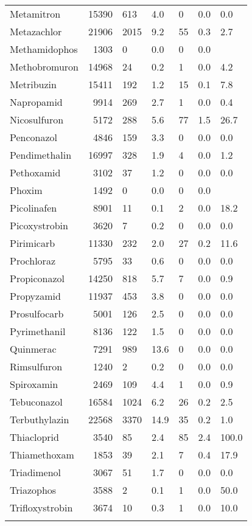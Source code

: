 \begin{longtable}{p{3cm}rR{1.4cm}R{1.4cm}R{1.4cm}R{1.4cm}R{1.4cm}}
  Metamitron & 15390 & 613 & 4.0 &  0 & 0.0 & 0.0 \\ 
  Metazachlor & 21906 & 2015 & 9.2 & 55 & 0.3 & 2.7 \\ 
  Methamidophos & 1303 &  0 & 0.0 &  0 & 0.0 &  \\ 
  Methobromuron & 14968 & 24 & 0.2 &  1 & 0.0 & 4.2 \\ 
  Metribuzin & 15411 & 192 & 1.2 & 15 & 0.1 & 7.8 \\ 
  Napropamid & 9914 & 269 & 2.7 &  1 & 0.0 & 0.4 \\ 
  Nicosulfuron & 5172 & 288 & 5.6 & 77 & 1.5 & 26.7 \\ 
  Penconazol & 4846 & 159 & 3.3 &  0 & 0.0 & 0.0 \\ 
  Pendimethalin & 16997 & 328 & 1.9 &  4 & 0.0 & 1.2 \\ 
  Pethoxamid & 3102 & 37 & 1.2 &  0 & 0.0 & 0.0 \\ 
  Phoxim & 1492 &  0 & 0.0 &  0 & 0.0 &  \\ 
  Picolinafen & 8901 & 11 & 0.1 &  2 & 0.0 & 18.2 \\ 
  Picoxystrobin & 3620 &  7 & 0.2 &  0 & 0.0 & 0.0 \\ 
  Pirimicarb & 11330 & 232 & 2.0 & 27 & 0.2 & 11.6 \\ 
  Prochloraz & 5795 & 33 & 0.6 &  0 & 0.0 & 0.0 \\ 
  Propiconazol & 14250 & 818 & 5.7 &  7 & 0.0 & 0.9 \\ 
  Propyzamid & 11937 & 453 & 3.8 &  0 & 0.0 & 0.0 \\ 
  Prosulfocarb & 5001 & 126 & 2.5 &  0 & 0.0 & 0.0 \\ 
  Pyrimethanil & 8136 & 122 & 1.5 &  0 & 0.0 & 0.0 \\ 
  Quinmerac & 7291 & 989 & 13.6 &  0 & 0.0 & 0.0 \\ 
  Rimsulfuron & 1240 &  2 & 0.2 &  0 & 0.0 & 0.0 \\ 
  Spiroxamin & 2469 & 109 & 4.4 &  1 & 0.0 & 0.9 \\ 
  Tebuconazol & 16584 & 1024 & 6.2 & 26 & 0.2 & 2.5 \\ 
  Terbuthylazin & 22568 & 3370 & 14.9 & 35 & 0.2 & 1.0 \\ 
  Thiacloprid & 3540 & 85 & 2.4 & 85 & 2.4 & 100.0 \\ 
  Thiamethoxam & 1853 & 39 & 2.1 &  7 & 0.4 & 17.9 \\ 
  Triadimenol & 3067 & 51 & 1.7 &  0 & 0.0 & 0.0 \\ 
  Triazophos & 3588 &  2 & 0.1 &  1 & 0.0 & 50.0 \\ 
  Trifloxystrobin & 3674 & 10 & 0.3 &  1 & 0.0 & 10.0 \\ 
   \bottomrule
\label{tab:rac_dat}
\end{longtable}
